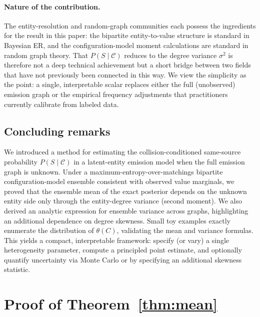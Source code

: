 \documentclass[11pt]{article}
\newcommand{\1}{\mathbf{1}}
\newcommand{\coll}{\mathcal{C}} %
\theoremstyle{plain}
\theoremstyle{definition}
\begin{document}
\paragraph{Nature of the contribution.}
The entity-resolution and random-graph communities each possess the ingredients for the result in this paper: the bipartite entity-to-value structure is standard in Bayesian ER, and the configuration-model moment calculations are standard in random graph theory.
That $P(S\mid\coll)$ reduces to the degree variance $\sigma^2$ is therefore not a deep technical achievement but a short bridge between two fields that have not previously been connected in this way.
We view the simplicity as the point: a single, interpretable scalar replaces either the full (unobserved) emission graph or the empirical frequency adjustments that practitioners currently calibrate from labeled data.

\subsection{Concluding remarks}

We introduced a method for estimating the collision-conditioned same-source probability $P(S\mid \coll)$ in a latent-entity emission model when the full emission graph is unknown.
Under a maximum-entropy-over-matchings bipartite configuration-model ensemble consistent with observed value marginals, we proved that the ensemble mean of the exact posterior depends on the unknown entity side only through the entity-degree variance (second moment).
We also derived an analytic expression for ensemble variance across graphs, highlighting an additional dependence on degree skewness.
Small toy examples exactly enumerate the distribution of $\theta(C)$, validating the mean and variance formulas.
This yields a compact, interpretable framework: specify (or vary) a single heterogeneity parameter, compute a principled point estimate, and optionally quantify uncertainty via Monte Carlo or by specifying an additional skewness statistic.

\appendix
\section{Proof of Theorem~\ref{thm:mean}}
\label{app:meanproof}
\end{document}
